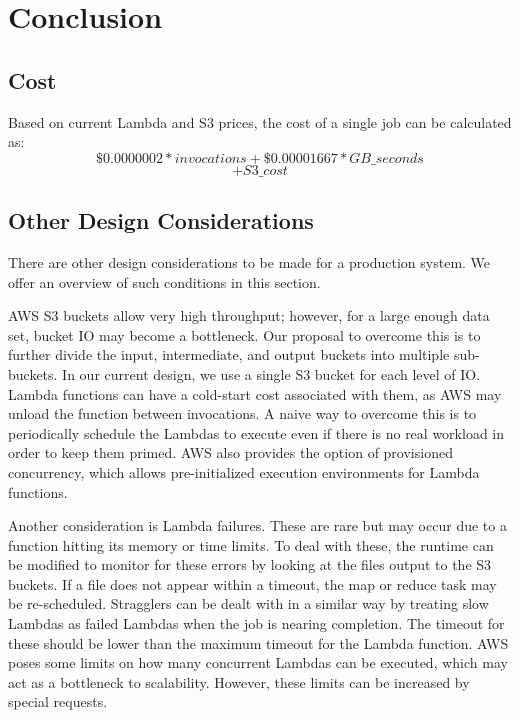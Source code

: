 \section{Conclusion}


\subsection{Cost}

Based on current Lambda and S3 prices, the cost of a single job can be calculated as:
\[\$0.0000002 * invocations + \$0.00001667 * GB\_seconds \]
\[+ S3\_cost\]

\subsection{Other Design Considerations}

There are other design considerations to be made for a production system. We offer an overview of such conditions in this section.

AWS S3 buckets allow very high throughput; however, for a large enough data set, bucket IO may become a bottleneck. Our proposal to overcome this is to further divide the input, intermediate, and output buckets into multiple sub-buckets. In our current design, we use a single S3 bucket for each level of IO. Lambda functions can have a cold-start cost associated with them, as AWS may unload the function between invocations. A naive way to overcome this is to periodically schedule the Lambdas to execute even if there is no real workload in order to keep them primed. AWS also provides the option of provisioned concurrency, which allows pre-initialized execution environments for Lambda functions.

Another consideration is Lambda failures. These are rare but may occur due to a function hitting its memory or time limits. To deal with these, the runtime can be modified to monitor for these errors by looking at the files output to the S3 buckets. If a file does not appear within a timeout, the map or reduce task may be re-scheduled. Stragglers can be dealt with in a similar way by treating slow Lambdas as failed Lambdas when the job is nearing completion. The timeout for these should be lower than the maximum timeout for the Lambda function. AWS poses some limits on how many concurrent Lambdas can be executed, which may act as a bottleneck to scalability. However, these limits can be increased by special requests.